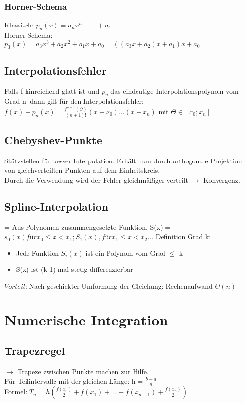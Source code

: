\documentclass[10pt,landscape,a4paper]{article}
\begin{document}
\begin{multicols}{3}
\subsubsection{Horner-Schema}
Klassisch: $p_n(x)=a_nx^n + ... + a_0$\\
Horner-Schema: \\
$p_3(x) = a_3x^3 + a_2x^2 +a_1x+a_0 = ((a_3x+a_2)x+a_1)x+a_0$


\subsection{Interpolationsfehler}
Falls f hinreichend glatt ist und $p_n$ das eindeutige Interpolationspolynom vom Grad n, dann gilt für den Interpolationsfehler: \\
$f(x)-p_n(x) = \frac{f^{n+1}(\Theta)}{(n+1)!}(x-x_0) ... (x-x_n)$ mit $\Theta \in [x_0;x_n]$


\subsection{Chebyshev-Punkte}
Stützstellen für besser Interpolation. Erhält man durch orthogonale Projektion von gleichverteilten Punkten auf dem Einheitskreis. \\
Durch die Verwendung wird der Fehler gleichmäßiger verteilt $\rightarrow$ Konvergenz.

\subsection{Spline-Interpolation}
= Aus Polynomen zusammengesetzte Funktion.
S(x) = $s_0(x) für x_0 \leq x < x_1; S_1(x), für x_1 \leq x < x_2 ...$
Definition Grad k:
\begin{itemize}
	\setlength\itemsep{-0.2em}
	\item Jede Funktion $S_i(x)$ ist ein Polynom vom Grad $\leq$ k
	\item S(x) ist (k-1)-mal stetig differenzierbar
\end{itemize}
$\underline{Vorteil}$: Nach geschickter Umformung der Gleichung: Rechenaufwand $\Theta(n)$

\section{Numerische Integration}
\subsection{Trapezregel}
$\rightarrow$ Trapeze zwischen Punkte machen zur Hilfe. \\
Für Teilintervalle mit der gleichen Länge: h = $\frac{b-a}{n}$ \\
Formel: $T_n = h ( \frac{f(x_0)}{2} + f(x_1) + ... + f(x_{n-1}) + \frac{f(x_n)}{2})$


\end{multicols}
\end{document}
